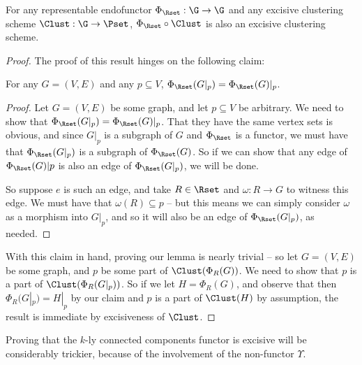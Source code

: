 \documentclass[a4paper,reqno,oneside]{article} %
\begin{document}
\begin{lemma}\label{lem:endofunctor_circ_excisive_is_excisive}
    For any representable endofunctor $\Phi_\Rset: \G \to \G$ and any excisive clustering scheme $\Clust: \G \to \Pset$, $\Phi_\Rset \circ \Clust$ is also an excisive clustering scheme.
\end{lemma}
\begin{proof}
    The proof of this result hinges on the following claim:
    \begin{claim}\label{claim:phi_commutes_with_restriction}
        For any $G = (V,E)$ and any $p \subseteq V$, $\Phi_\Rset(G|_p) = \Phi_\Rset(G)|_p$.
    \end{claim}
    \begin{proof}
        Let $G = (V,E)$ be some graph, and let $p \subseteq V$ be arbitrary. We need to show that $\Phi_\Rset(G|_p) = \Phi_\Rset(G)|_p$. That they have the same vertex sets is obvious, and since $G|_p$ is a subgraph of $G$ and $\Phi_\Rset$ is a functor, we must have that $\Phi_\Rset(G|_p)$ is a subgraph of $\Phi_\Rset(G)$. So if we can show that any edge of $\Phi_\Rset(G)|p$ is also an edge of $\Phi_\Rset(G|_p)$, we will be done.

        So suppose $e$ is such an edge, and take $R \in \Rset$ and $\omega: R \to G$ to witness this edge. We must have that $\omega(R) \subseteq p$ -- but this means we can simply consider $\omega$ as a morphism into $G|_p$, and so it will also be an edge of $\Phi_\Rset(G|_p)$, as needed.
    \end{proof}

    With this claim in hand, proving our lemma is nearly trivial -- so let $G = (V,E)$ be some graph, and $p$ be some part of $\Clust(\Phi_R(G))$. We need to show that $p$ is a part of $\Clust(\Phi_R(G|_p))$. So if we let $H = \Phi_R(G)$, and observe that then $\Phi_R(G|_p) = H|_p$ by our claim and $p$ is a part of $\Clust(H)$ by assumption, the result is immediate by excisiveness of $\Clust$. 
\end{proof}

Proving that the $k$-ly connected components functor is excisive will be considerably trickier, because of the involvement of the non-functor $\Upsilon$.
\end{document}
